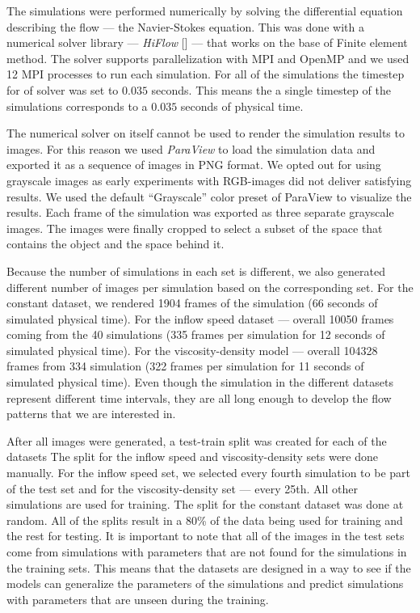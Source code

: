 \documentclass{llncs}
\begin{document}
The simulations were performed numerically by solving the differential equation describing the flow --- the Navier-Stokes equation. This was done with a numerical solver library --- \emph{HiFlow} [] ---  that works on the base of Finite element method. The solver supports parallelization with MPI and OpenMP and we used 12 MPI processes to run each simulation. For all of the simulations the timestep for of solver was set to $0.035$ seconds. This means the a single timestep of the simulations corresponds to a $0.035$ seconds of physical time.

The numerical solver on itself cannot be used to render the simulation results to images. For this reason we used \emph{ParaView} to load the simulation data and exported it as a sequence of images in PNG format. We opted out for using grayscale images as early experiments with RGB-images did not deliver satisfying results. We used the default ``Grayscale'' color preset of ParaView to visualize the results. Each frame of the simulation was exported as three separate grayscale images. The images were finally cropped to select a subset of the space that contains the object and the space behind it.

Because the number of simulations in each set is different, we also generated different number of images per simulation based on the corresponding set. For the constant dataset, we rendered 1904 frames of the simulation (66 seconds of simulated physical time). For the inflow speed dataset --- overall 10050 frames coming from the 40 simulations (335 frames per simulation for 12 seconds of simulated physical time). For the viscosity-density model --- overall 104328 frames from 334 simulation (322 frames per simulation for 11 seconds of simulated physical time). Even though the simulation in the different datasets represent different time intervals, they are all long enough to develop the flow patterns that we are interested in.

After all images were generated, a test-train split was created for each of the datasets The split for the inflow speed and viscosity-density sets were done manually. For the inflow speed set, we selected every fourth simulation to be part of the test set and for the viscosity-density set --- every 25th. All other simulations are used for training. The split for the constant dataset was done at random. All of the splits result in a 80\% of the data being used for training and the rest for testing. It is important to note that all of the images in the test sets come from simulations with parameters that are not found for the simulations in the training sets. This means that the datasets are designed in a way to see if the models can generalize the parameters of the simulations and predict simulations with parameters that are unseen during the training.
\end{document}

